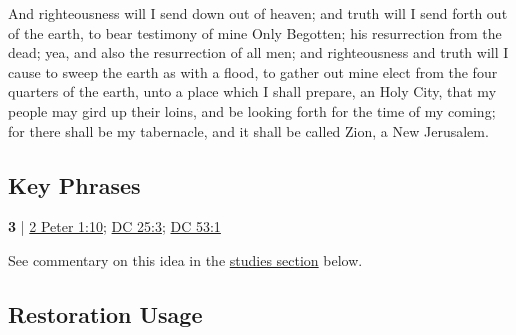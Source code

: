 		\begin{compactdesc}
			\item[{\hyperref[MOSES-7-62]{Moses 7:62}}] And righteousness will I send down out of heaven; and truth will I send forth out of the earth, to bear testimony of mine Only Begotten; his resurrection from the dead; yea, and also the resurrection of all men; and righteousness and truth will I cause to sweep the earth as with a flood, to gather out mine elect from the four quarters of the earth, unto a place which I shall prepare, an Holy City, that my people may gird up their loins, and be looking forth for the time of my coming; for there shall be my tabernacle, and it shall be called Zion, a New Jerusalem.
		\end{compactdesc}
		
\subsection{Key Phrases} %
	\label{ELECTION-PHRASES}

	\begin{compactdesc}
		\item[calling and election] \textbf{3} | \hyperref[2PETER-1-10]{2 Peter 1:10}; \hyperref[DC25-3]{DC 25:3}; \hyperref[DC53-1]{DC 53:1}
			\begin{compactdesc}
				\item[Bible anchor verses] \phantom{.}
					\begin{compactdesc}
						\item[2 Peter 1:10]  \hyperref[EKLOGE]{} 
					\end{compactdesc}
				\item[Commentary] See commentary on this idea in the \hyperref[ELECTION-calling]{studies section} below.
			\end{compactdesc}
	\end{compactdesc}
	

\subsection{Restoration Usage} %
	\label{ELECTION-RESTORATION}

